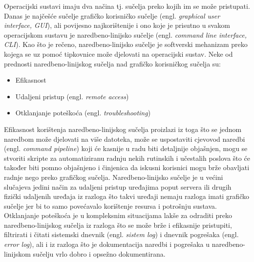 \documentclass{foi}
\begin{document}
Operacijski sustavi imaju dva načina tj. sučelja preko kojih im se može pristupati. Danas je najčešće sučelje grafičko korisničko sučelje (engl. \textit{graphical user interface, GUI}), ali povijesno najkorištenije i ono koje je prisutno u svakom operacijskom sustavu je naredbeno-linijsko sučelje (engl. \textit{command line interface, CLI}). Kao što je rečeno, naredbeno-linijsko sučelje je softverski mehanizam preko kojega se uz pomoć tipkovnice može djelovati na operacijski sustav.\cite{AWSShell} Neke od prednosti naredbeno-linijskog sučelja nad grafičko korisničkog sučelja su:\cite{AWSShell}
\begin{itemize}
    \item Efikasnost
    \item Udaljeni pristup (engl. \textit{remote access})
    \item Otklanjanje poteškoća (engl. \textit{troubleshooting})
\end{itemize}
Efikasnost korištenja naredbeno-linijskog sučelja proizlazi iz toga što se jednom naredbom može djelovati na više datoteka, može se uspostaviti cjevovod naredbi (engl. \textit{command pipeline}) koji će kasnije u radu biti detaljnije objašnjen, mogu se stvoriti skripte za automatiziranu radnju nekih rutinskih i učestalih poslova što će također biti pomno objašnjeno i činjenica da iskusni korisnici mogu brže obavljati radnje nego preko grafičkog sučelja. Naredbeno-linijsko sučelje je u većini slučajeva jedini način za udaljeni pristup uređajima poput servera ili drugih fizički udaljenih uređaja iz razloga što takvi uređaji nemaju razloga imati grafičko sučelje jer bi to samo povećavalo korištenje resursa i potrošnju sustava. Otklanjanje poteškoća je u kompleksnim situacijama lakše za odraditi preko naredbeno-linijskog sučelja iz razloga što se može brže i efikasnije pristupiti, filtrirati i čitati sistemski dnevnik (engl. \textit{sistem log}) i dnevnik pogrešaka (engl. \textit{error log}), ali i iz razloga što je dokumentacija naredbi i pogrešaka u naredbeno-linijskom sučelju vrlo dobro i opsežno dokumentirana.\cite{AWSShell}
\end{document}
